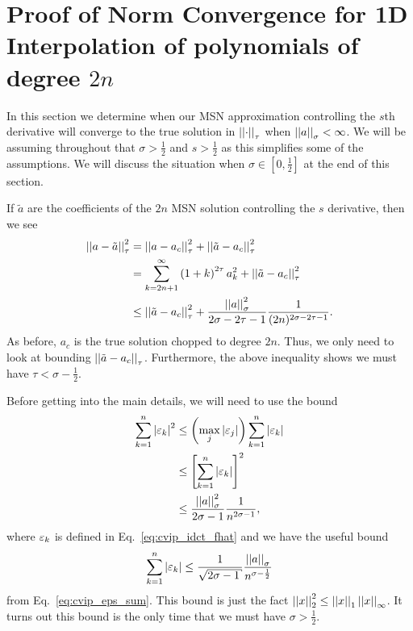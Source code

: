 \section{Proof of Norm Convergence for 1D Interpolation of polynomials
    of degree $2n$}
\label{sec:cvip_interp_1D_norm}

In this section we determine when our MSN approximation controlling the
$s$th derivative will converge to the true solution in $\left| \left| \cdot \right| \right|_{\tau}$
when $\left| \left| a \right| \right|_{\sigma}<\infty$.
We will be assuming throughout that $\sigma>\frac{1}{2}$
and $s>\frac{1}{2}$ as this simplifies some of the assumptions.
We will discuss the situation when $\sigma\in[0,\frac{1}{2}]$ at
the end of this section.

If $\tilde{a}$ are the coefficients of the $2n$ MSN solution controlling
the $s$ derivative, then we see
%
\begin{align}
    \left| \left| a-\tilde{a} \right| \right|_{\tau}^{2} &= \left| \left| a-a_{c} \right| \right|_{\tau}^{2}
        + \left| \left| \tilde{a}-a_{c} \right| \right|_{\tau}^{2} \nonumber\\
    &= \sum_{k=2n+1}^{\infty} \left( 1+k \right)^{2\tau}a_{k}^{2}
        + \left| \left| \tilde{a}-a_{c} \right| \right|_{\tau}^{2} \nonumber\\
    &\le \left| \left| \tilde{a}-a_{c} \right| \right|_{\tau}^{2}
        + \frac{\left| \left| a \right| \right|_{\sigma}^{2}}{2\sigma-2\tau-1}
        \frac{1}{(2n)^{2\sigma-2\tau-1}}.
\end{align}
%
As before, $a_{c}$ is the true solution chopped to degree $2n$.
Thus, we only need to look at bounding $\left| \left| \tilde{a}-a_{c} \right| \right|_{\tau}$.
Furthermore, the above inequality shows we must have $\tau<\sigma-\frac{1}{2}$.

Before getting into the main details, we will need to use the bound
%
\begin{align}
    \sum_{k=1}^{n}\left| \varepsilon_{k} \right|^{2}
        &\le \left( \max_{j} \left| \varepsilon_{j} \right| \right)
            \sum_{k=1}^{n}\left| \varepsilon_{k} \right| \nonumber\\
    &\le \left[ \sum_{k=1}^{n}\left| \varepsilon_{k} \right| \right]^{2} \nonumber\\
    &\le \frac{\left| \left| a \right| \right|_{\sigma}^{2}}{2\sigma-1}\frac{1}{n^{2\sigma-1}},
\end{align}
%
where $\varepsilon_{k}$ is defined in Eq.~\eqref{eq:cvip_idct_fhat}
and we have the useful bound
%
\begin{equation}
    \sum_{k=1}^{n} \abs{\eps_{k}} \le
        \frac{1}{\sqrt{2\sigma-1}}\frac{\norm{a}_{\sigma}}{
        n^{\sigma-\frac{1}{2}}}
\end{equation}
%
from Eq.~\eqref{eq:cvip_eps_sum}.
This bound is just the fact
$\left| \left| x \right| \right|_{2}^{2} \le \left| \left| x \right| \right|_{1}\left| \left| x \right| \right|_{\infty}$.
It turns out this bound is the only time that we must have
$\sigma>\frac{1}{2}$.

